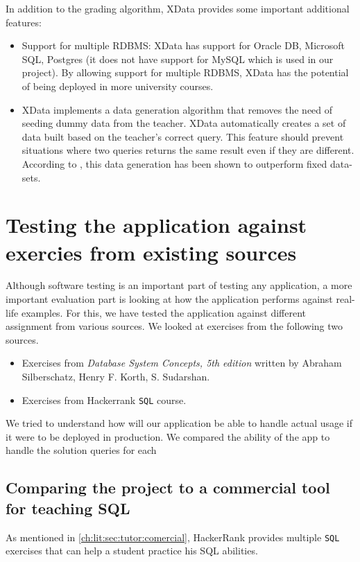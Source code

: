 In addition to the grading algorithm, XData provides some important additional features:
\begin{itemize}
    \item Support for multiple RDBMS: XData has support for Oracle DB, Microsoft SQL, Postgres (it does not have support for MySQL which is used in our project). By allowing support for multiple RDBMS, XData has the potential of being deployed in more university courses.
    \item XData implements a data generation algorithm that removes the need of seeding dummy data from the teacher. XData automatically creates a set of data built based on the teacher's correct query. This feature should prevent situations where two queries returns the same result even if they are different. According to \cite{lit:xdata_d}, this data generation has been shown to outperform fixed data-sets.
\end{itemize}

\section{Testing the application against exercies from existing sources}
Although software testing is an important part of testing any application, a more important evaluation part is looking at how the application performs against real-life examples. For this, we have tested the application against different assignment from various sources. We looked at exercises from the following two sources.

\begin{itemize}
    \item Exercises from \textit{Database System Concepts, 5th edition} written by Abraham Silberschatz, Henry F. Korth, S. Sudarshan.
    \item Exercises from Hackerrank \texttt{SQL} course.
\end{itemize}

We tried to understand how will our application be able to handle actual usage if it were to be deployed in production. We compared the ability of the app to handle the solution queries for each

\subsection{Comparing the project to a commercial tool for teaching SQL}

As mentioned in \ref{ch:lit:sec:tutor:comercial}, HackerRank provides multiple \texttt{SQL} exercises that can help a student practice his SQL abilities.

